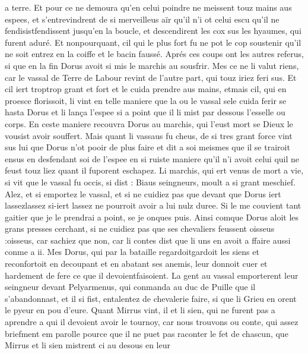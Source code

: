 \documentclass{article}
\begin{document}
\begin{pages}
   a terre. Et pour ce ne demoura qu’en celui poindre ne meissent touz mains aus espees, et s’entrevindrent de si merveilleus aïr 
   qu’il n’i ot celui escu qu’il ne 
   fendisistfendissent jusqu’en la boucle, 
   et descendirent les cox sus les hyaumes, qui furent aduré. Et nonpourquant, cil qui le plus fort 
   fu ne pot le cop soustenir qu’il ne 
   soit entrez en la coiffe et le bacin faussé. 
   Aprés ces coups ont les autres referus, si que en la fin Dorus avoit si mis 
   le marchis au sousfrir. Mes ce ne li valut riens, car 
   le vassal de Terre de Labour 
   revint de l’autre part, qui touz iriez feri sus. Et cil iert troptrop grant et 
   fort et le cuida prendre aus mains, etmais cil, qui en proesce florissoit, 
   li vint en telle maniere que la ou le vassal sele cuida ferir se hasta 
   Dorus et li lança l’espee si a point que il li mist par dessous l’esselle ou corps. En ceste maniere 
   recouvra Dorus au 
   marchis, qui l’eust mort se Dieux le vousist avoir souffert. 
   Mais quant li vassaus 
   fu cheus, de si tres grant force vint sus 
   lui que Dorus n’ot pooir de plus faire et dit a soi meismes que 
   il se trairoit ensus en desfendant soi de l’espee en si ruiste maniere qu’il n’i avoit celui quil 
      ne feust touz liez quant il fuporent eschapez. \pend
\pstart Li marchis, qui ert venus de mort a vie, 
   si vit que le vassal fu occis, si dist :
   Biaus seingneurs, moult a si grant meschief. Alez, et si emportez 
      le vassal, et si ne cuidiez pas que devant que 
      Dorus iert lassezlassez si-iert lassez 
   ne pourroit avoir a lui nulz duree. Si le me couvient tant gaitier que je le prendrai a point, se je onques puis.
   Ainsi comque Dorus aloit les grans presses
   cerchant, si ne cuidiez pas que ses chevaliers feussent oisseus :oisseus, car 
   sachiez que non, car li contes dist que li 
   uns en avoit a ffaire aussi conme a ii. Mes Dorus, qui par la bataille 
   regardoitgardoit les siens 
   et reconfortoit en decoupant et en abatant ses anemis, leur donnoit cuer et hardement de fere ce que il 
   devoientfaisoient. La gent au 
   vassal 
   emporterent leur seingneur devant Pelyarmenus, 
   qui conmanda au duc de Puille que il s’abandonnast, et il si fist, entalentez de chevalerie faire, 
   si que li Grieu en orent le pyeur en pou d’eure. 
   Quant Mirrus vint, il et li sien, qui ne furent pas a aprendre a qui il devoient avoir le tournoy, 
   car nous trouvons ou conte, qui assez briefment em parolle pource que il ne puet pas raconter le fet de chascun, 
   que Mirrus et li sien mistrent ci au desous en leur 

\end{pages}
\end{document}
